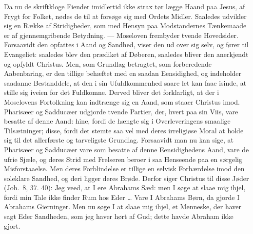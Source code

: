 \documentclass[12pt,a4paper]{book}
\begin{document}
Da nu de skriftkloge Fiender imidlertid ikke strax tør lægge Haand paa Jesus, af Frygt for
Folket, nødes de til at forsøge sig med Ordets Midler. Saaledes udvikler sig en Række af
Stridigheder, som med Hensyn paa Modstandernes Tænkemaade er af gjennemgribende Betydning.
--- Moseloven frembyder tvende Hovedsider. Forsaavidt den opfattes i Aand og Sandhed, viser
den ud over sig selv, og fører til Evangeliet: saaledes blev den prædiket af Døberen,
saaledes bliver den anerkjendt og opfyldt Christus. Men, som Grundlag betragtet, som
forberedende Aabenbaring, er den tillige behæftet med en saadan Eensidighed, og indeholder
saadanne Bestanddele, at den i sin Ufuldkommenhed
saare let kan faae isinde, at stille sig iveien for det Fuldkomne. Derved bliver det
forklarligt, at der i Moselovens Fortolkning kan indtrænge sig en Aand, som staaer Christus
imod. Pharisæer og Sadducæer udgjorde tvende Partier, der, hvert paa sin Viis, vare besatte
af denne Aand: hine, fordi de hængte sig i Overleveringens smaalige Tilsætninger; disse,
fordi det stemte saa vel med deres irreligiøse Moral at holde sig til det allerførste og
tarveligste Grundlag. Forsaavidt man nu kan sige, at Pharisæer og Sadducæer vare som
besatte af denne Eensidighedens Aand, vare de ufrie Sjæle, og deres Strid med Frelseren
beroer i saa Henseende paa en sørgelig Misforstaaelse. Men deres Forblindelse er tillige en
selvisk Forhærdelse imod den soleklare Sandhed, og deri ligger deres Brøde. Derfor siger
Christus til disse Jøder (Joh.\ 8, 37. 40):
\begingroup\large
Jeg veed, at I ere Abrahams Sæd: men I søge at slaae mig ihjel, fordi min Tale ikke finder
Rum hos Eder \dots{} Vare I Abrahams Børn, da gjorde I Abrahams Gierninger. Men nu søge I
at slaae mig ihjel, et Menneske, der haver sagt Eder Sandheden, som jeg haver hørt af Gud;
dette havde Abraham ikke gjort.
\par\endgroup
\end{document}
